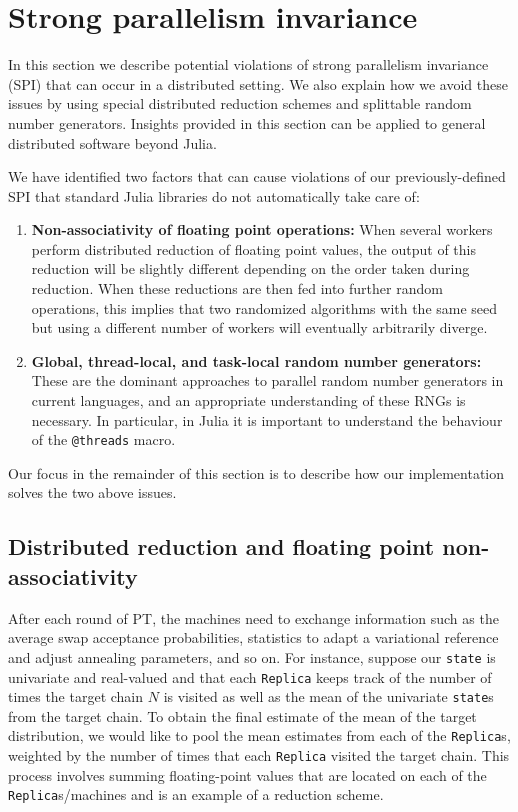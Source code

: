\section{Strong parallelism invariance}
\label{sec:PI_causes}
In this section we describe potential violations of 
strong parallelism invariance (SPI) that can occur in a distributed setting. 
We also explain how we avoid these issues by using special 
distributed reduction schemes and splittable random number generators. 
Insights provided in this section can be applied 
to general distributed software beyond Julia.

\medskip 
We have identified two factors that can cause violations of our previously-defined 
SPI that standard Julia libraries 
do not automatically take care of:
\begin{enumerate}   
  \item \textbf{Non-associativity of floating point operations:} When 
  several workers perform distributed reduction of floating point values, 
  the output of this reduction will be slightly different depending on the order taken 
  during reduction. 
  When these reductions are then fed into further random operations, 
  this implies that two randomized algorithms with the same seed but using a 
  different number of workers will eventually arbitrarily diverge.

  \item \textbf{Global, thread-local, and task-local random number generators:} 
  These are the dominant approaches to parallel random number generators in current languages, 
  and an appropriate understanding of these RNGs is necessary. In particular, 
  in Julia it is important to understand the behaviour of the \texttt{@threads} macro.
\end{enumerate}
Our focus in the remainder of this section is to describe how our implementation 
solves the two above issues.


\subsection{Distributed reduction and floating point non-associativity}
After each round of PT, the machines need to exchange information such as the 
average swap acceptance probabilities, statistics to adapt a variational 
reference and adjust annealing parameters, and so on. 
For instance, suppose our \texttt{state} is univariate and real-valued and 
that each \texttt{Replica} keeps track of the number of times the target chain $N$ 
is visited as well as the mean of the univariate \texttt{state}s from the target chain.
To obtain the final estimate of the mean of the target distribution, we would like 
to pool the mean estimates from each of the \texttt{Replica}s, weighted by 
the number of times that each \texttt{Replica} visited the target chain.   
This process involves summing floating-point values that are located on each 
of the \texttt{Replica}s/machines and is an example of a reduction scheme.

